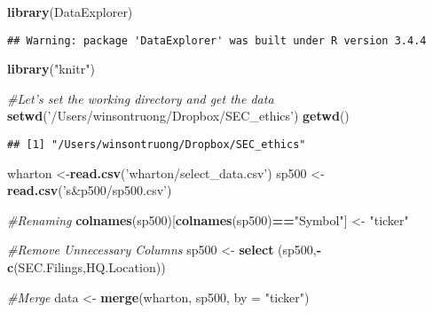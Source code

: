\documentclass[]{article}
\newenvironment{Shaded}{\begin{snugshade}}{\end{snugshade}}
\newcommand{\CommentTok}[1]{\textcolor[rgb]{0.56,0.35,0.01}{\textit{#1}}}
\newcommand{\DataTypeTok}[1]{\textcolor[rgb]{0.13,0.29,0.53}{#1}}
\newcommand{\KeywordTok}[1]{\textcolor[rgb]{0.13,0.29,0.53}{\textbf{#1}}}
\newcommand{\NormalTok}[1]{#1}
\newcommand{\OperatorTok}[1]{\textcolor[rgb]{0.81,0.36,0.00}{\textbf{#1}}}
\newcommand{\StringTok}[1]{\textcolor[rgb]{0.31,0.60,0.02}{#1}}
\begin{document}
\begin{Shaded}
\begin{Highlighting}[]
\KeywordTok{library}\NormalTok{(DataExplorer)}
\end{Highlighting}
\end{Shaded}

\begin{verbatim}
## Warning: package 'DataExplorer' was built under R version 3.4.4
\end{verbatim}

\begin{Shaded}
\begin{Highlighting}[]
\KeywordTok{library}\NormalTok{(}\StringTok{"knitr"}\NormalTok{)}
\end{Highlighting}
\end{Shaded}

\begin{Shaded}
\begin{Highlighting}[]
\CommentTok{#Let's set the working directory and get the data}
\KeywordTok{setwd}\NormalTok{(}\StringTok{'/Users/winsontruong/Dropbox/SEC_ethics'}\NormalTok{)}
\KeywordTok{getwd}\NormalTok{()}
\end{Highlighting}
\end{Shaded}

\begin{verbatim}
## [1] "/Users/winsontruong/Dropbox/SEC_ethics"
\end{verbatim}

\begin{Shaded}
\begin{Highlighting}[]
\NormalTok{wharton <-}\KeywordTok{read.csv}\NormalTok{(}\StringTok{'wharton/select_data.csv'}\NormalTok{)}
\NormalTok{sp500 <-}\StringTok{ }\KeywordTok{read.csv}\NormalTok{(}\StringTok{'s&p500/sp500.csv'}\NormalTok{)}
\end{Highlighting}
\end{Shaded}

\begin{Shaded}
\begin{Highlighting}[]
\CommentTok{#Renaming}
\KeywordTok{colnames}\NormalTok{(sp500)[}\KeywordTok{colnames}\NormalTok{(sp500)}\OperatorTok{==}\StringTok{"Symbol"}\NormalTok{] <-}\StringTok{ "ticker"}

\CommentTok{#Remove Unnecessary Columns}
\NormalTok{sp500 <-}\StringTok{ }\KeywordTok{select}\NormalTok{ (sp500,}\OperatorTok{-}\KeywordTok{c}\NormalTok{(SEC.Filings,HQ.Location))}

\CommentTok{#Merge}
\NormalTok{data <-}\StringTok{ }\KeywordTok{merge}\NormalTok{(wharton, sp500, }\DataTypeTok{by =} \StringTok{"ticker"}\NormalTok{)}
\end{Highlighting}
\end{Shaded}
\end{document}
